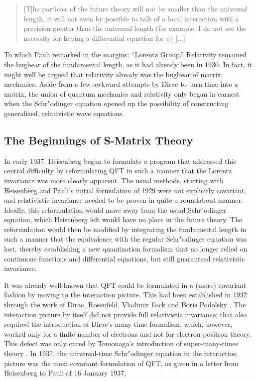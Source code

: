 \documentclass[12pt]{article}
\begin{document}
\begin{quote}
[T]he particles of the future theory will not be smaller than the universal length, it will not even by possible to talk of a local interaction with a precision greater than the universal length (for example, I do not see the necessity for having a differential equation for $\psi$) [...]
\end{quote}

To which Pauli remarked in the margins: ``Lorentz Group.'' Relativity remained the bugbear of the fundamental length, as it had already been in 1930. In fact, it might well be argued that relativity already was the bugbear of matrix mechanics: Aside from a few awkward attempts by Dirac to turn time into a matrix, the union of quantum mechanics and relativity only began in earnest when the Schr"odinger equation opened up the possibility of constructing generalized, relativistic wave equations.


\subsection{The Beginnings of S-Matrix Theory}

In early 1937, Heisenberg began to formulate a program that addressed this central difficulty by reformulating QFT in such a manner that the Lorentz invariance was more clearly apparent. The usual methods, starting with Heisenberg and Pauli's initial formulation of 1929 were not explicitly covariant, and relativistic invariance needed to be proven in quite a roundabout manner. Ideally, this reformulation would move away from the usual Schr"odinger equation, which Heisenberg felt would have no place in the future theory. The reformulation would then be modified by integrating the fundamental length in such a manner that the equivalence with the regular Schr"odinger equation was lost, thereby establishing a new quantization formalism that no longer relied on continuous functions and differential equations, but still guaranteed relativistic invariance.

It was already well-known that QFT could be formulated in a (more) covariant fashion by moving to the interaction picture. This had been established in 1932 through the work of Dirac, Rosenfeld, Vladimir Fock and Boris Podolsky \citep{dirac_1932_relativistic, rosenfeld_1932_uber-eine-mogliche, dirac_1932_on-quantum}. The interaction picture by itself did not provide full relativistic invariance; that also required the introduction of Dirac's many-time formalism, which, however, worked only for a finite number of electrons and not for electron-positron theory. This defect was only cured by Tomonaga's introduction of super-many-times theory \citep{tomonaga_1946_on-a-relativistically}. In 1937, the universal-time Schr"odinger equation in the interaction picture was the most covariant formulation of QFT, as given in a letter from Heisenberg to Pauli of 16 January 1937,
\end{document}

